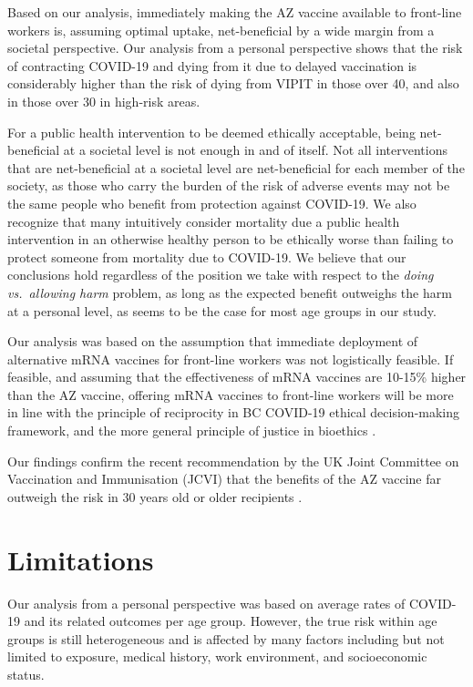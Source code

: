\documentclass[]{interact}
\theoremstyle{plain}%
\theoremstyle{definition}
\theoremstyle{remark}
\begin{document}
Based on our analysis, immediately making the AZ vaccine available to
front-line workers is, assuming optimal uptake, net-beneficial by a wide
margin from a societal perspective. Our analysis from a personal
perspective shows that the risk of contracting COVID-19 and dying from
it due to delayed vaccination is considerably higher than the risk of
dying from VIPIT in those over 40, and also in those over 30 in
high-risk areas.

For a public health intervention to be deemed ethically acceptable,
being net-beneficial at a societal level is not enough in and of itself.
Not all interventions that are net-beneficial at a societal level are
net-beneficial for each member of the society, as those who carry the
burden of the risk of adverse events may not be the same people who
benefit from protection against COVID-19. We also recognize that many
intuitively consider mortality due a public health intervention in an
otherwise healthy person to be ethically worse than failing to protect
someone from mortality due to COVID-19. We believe that our conclusions
hold regardless of the position we take with respect to the \emph{doing
vs.~allowing harm} problem\citep{woollard_doing_2016}, as long as the
expected benefit outweighs the harm at a personal level, as seems to be
the case for most age groups in our study.

Our analysis was based on the assumption that immediate deployment of
alternative mRNA vaccines for front-line workers was not logistically
feasible. If feasible, and assuming that the effectiveness of mRNA
vaccines are 10-15\% higher than the AZ vaccine, offering mRNA vaccines
to front-line workers will be more in line with the principle of
reciprocity in BC COVID-19 ethical decision-making
framework\citep{bccdc_covid-19_2020}, and the more general principle of
justice in bioethics \citep{mccormick_principles_2021}.

Our findings confirm the recent recommendation by the UK Joint Committee
on Vaccination and Immunisation (JCVI) that the benefits of the AZ
vaccine far outweigh the risk in 30 years old or older recipients
\citep{jcvi_jcvi_2021}.

\hypertarget{limitations}{%
\section{Limitations}\label{limitations}}

Our analysis from a personal perspective was based on average rates of
COVID-19 and its related outcomes per age group. However, the true risk
within age groups is still heterogeneous and is affected by many factors
including but not limited to exposure, medical history, work
environment, and socioeconomic status.
\end{document}
